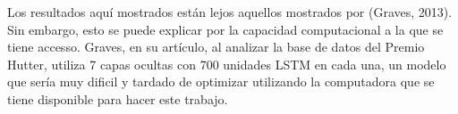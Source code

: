 \vspace{1em}

Los resultados aquí mostrados están lejos aquellos mostrados por (Graves, 2013). Sin embargo, esto se puede explicar por la capacidad computacional a la que se tiene accesso. Graves, en su artículo, al analizar la base de datos del Premio Hutter, utiliza 7 capas ocultas con 700 unidades LSTM en cada una, un modelo que sería muy dificil y tardado de optimizar utilizando la computadora que se tiene disponible para hacer este trabajo.
\cite{DBLP:journals/corr/Graves13}